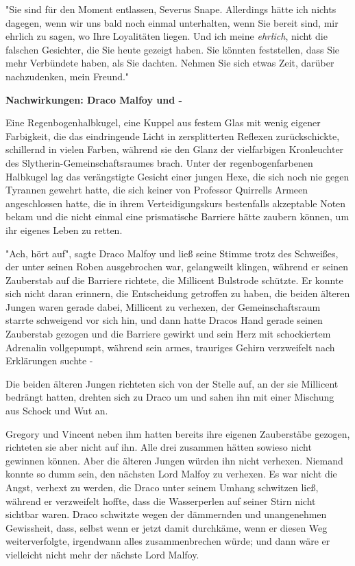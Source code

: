 {"Sie sind für den Moment entlassen, Severus Snape. Allerdings hätte ich nichts dagegen, wenn wir uns bald noch einmal unterhalten, wenn Sie bereit sind, mir ehrlich zu sagen, wo Ihre Loyalitäten liegen. Und ich meine \emph{ehrlich}, nicht die falschen Gesichter, die Sie heute gezeigt haben. Sie könnten feststellen, dass Sie mehr Verbündete haben, als Sie dachten. Nehmen Sie sich etwas Zeit, darüber nachzudenken, mein Freund."

\textbf{Nachwirkungen: Draco Malfoy und -}

Eine Regenbogenhalbkugel, eine Kuppel aus festem Glas mit wenig eigener Farbigkeit, die das eindringende Licht in zersplitterten Reflexen zurückschickte, schillernd in vielen Farben, während sie den Glanz der vielfarbigen Kronleuchter des Slytherin-Gemeinschaftsraumes brach. Unter der regenbogenfarbenen Halbkugel lag das verängstigte Gesicht einer jungen Hexe, die sich noch nie gegen Tyrannen gewehrt hatte, die sich keiner von Professor Quirrells Armeen angeschlossen hatte, die in ihrem Verteidigungskurs bestenfalls akzeptable Noten bekam und die nicht einmal eine prismatische Barriere hätte zaubern können, um ihr eigenes Leben zu retten.

"Ach, hört auf", sagte Draco Malfoy und ließ seine Stimme trotz des Schweißes, der unter seinen Roben ausgebrochen war, gelangweilt klingen, während er seinen Zauberstab auf die Barriere richtete, die Millicent Bulstrode schützte. Er konnte sich nicht daran erinnern, die Entscheidung getroffen zu haben, die beiden älteren Jungen waren gerade dabei, Millicent zu verhexen, der Gemeinschaftsraum starrte schweigend vor sich hin, und dann hatte Dracos Hand gerade seinen Zauberstab gezogen und die Barriere gewirkt und sein Herz mit schockiertem Adrenalin vollgepumpt, während sein armes, trauriges Gehirn verzweifelt nach Erklärungen suchte -

Die beiden älteren Jungen richteten sich von der Stelle auf, an der sie Millicent bedrängt hatten, drehten sich zu Draco um und sahen ihn mit einer Mischung aus Schock und Wut an.

Gregory und Vincent neben ihm hatten bereits ihre eigenen Zauberstäbe gezogen, richteten sie aber nicht auf ihn. Alle drei zusammen hätten sowieso nicht gewinnen können. Aber die älteren Jungen würden ihn nicht verhexen. Niemand konnte so dumm sein, den nächsten Lord Malfoy zu verhexen. Es war nicht die Angst, verhext zu werden, die Draco unter seinem Umhang schwitzen ließ, während er verzweifelt hoffte, dass die Wasserperlen auf seiner Stirn nicht sichtbar waren. Draco schwitzte wegen der dämmernden und unangenehmen Gewissheit, dass, selbst wenn er jetzt damit durchkäme, wenn er diesen Weg weiterverfolgte, irgendwann alles zusammenbrechen würde; und dann wäre er vielleicht nicht mehr der nächste Lord Malfoy.

}
